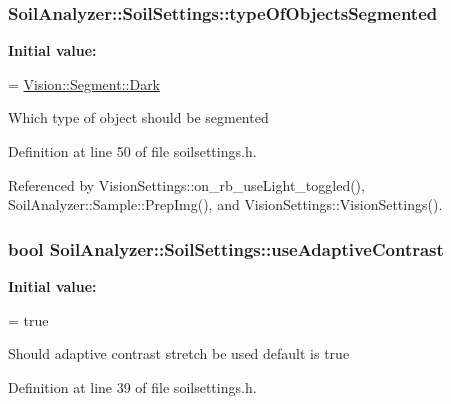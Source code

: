 \hypertarget{class_soil_analyzer_1_1_soil_settings_a21ae88dba6b9b0b07d9c26812bc739fb}{}
\subsubsection[{type\+Of\+Objects\+Segmented}]{ Soil\+Analyzer\+::\+Soil\+Settings\+::type\+Of\+Objects\+Segmented}\label{class_soil_analyzer_1_1_soil_settings_a21ae88dba6b9b0b07d9c26812bc739fb}
{\bfseries Initial value\+:}
\begin{DoxyCode}
=
      \hyperlink{class_vision_1_1_segment_ac3ddf2c72ee6333007510b680db1e7dda962a0c0955809f63df036dbd41824c54}{Vision::Segment::Dark}
\end{DoxyCode}
Which type of object should be segmented 

Definition at line 50 of file soilsettings.\+h.



Referenced by Vision\+Settings\+::on\+\_\+rb\+\_\+use\+Light\+\_\+toggled(), Soil\+Analyzer\+::\+Sample\+::\+Prep\+Img(), and Vision\+Settings\+::\+Vision\+Settings().

\hypertarget{class_soil_analyzer_1_1_soil_settings_a0e27335d05aed8f3f084744062368578}{}
\subsubsection[{use\+Adaptive\+Contrast}]{\setlength{\rightskip}{0pt plus 5cm}bool Soil\+Analyzer\+::\+Soil\+Settings\+::use\+Adaptive\+Contrast}\label{class_soil_analyzer_1_1_soil_settings_a0e27335d05aed8f3f084744062368578}
{\bfseries Initial value\+:}
\begin{DoxyCode}
=
      \textcolor{keyword}{true}
\end{DoxyCode}
Should adaptive contrast stretch be used default is true 

Definition at line 39 of file soilsettings.\+h.



